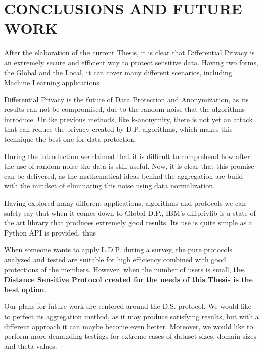\documentclass[inscr]{dithesis}
\begin{document}
\frontmatter

\mainmatter















\chapter{CONCLUSIONS AND FUTURE WORK}

After the elaboration of the current Thesis, it is clear that Differential Privacy is an extremely secure and efficient way to protect sensitive data. Having two forms, the Global and the Local, it can cover many different scenarios, including Machine Learning applications.

Differential Privacy is the future of Data Protection and Anonymization, as its results can not be compromised, due to the random noise that the algorithms introduce. Unlike previous methods, like k-anonymity, there is not yet an attack that can reduce the privacy created by D.P. algorithms, which makes this technique the best one for data protection.

During the introduction we claimed that it is difficult to comprehend how after the use of random noise the data is still useful. Now, it is clear that this promise can be delivered, as the mathematical ideas behind the aggregation are build with the mindset of eliminating this noise using data normalization.

Having explored many different applications, algorithms and protocols we can safely say that when it comes down to Global D.P., IBM's diffprivlib is a state of the art library that produces extremely good results. Its use is quite simple as a Python API is provided, thus 

When someone wants to apply L.D.P. during a survey, the pure protocols analyzed and tested are suitable for high efficiency combined with good protections of the members. However, when the number of users is small, \textbf{the Distance Sensitive Protocol created for the needs of this Thesis is the best option}. 

Our plans for future work are centered around the D.S. protocol. We would like to perfect its aggregation method, as it may produce satisfying results, but with a different approach it can maybe become even better. Moreover, we would like to perform more demanding testings for extreme cases of dataset sizes, domain sizes and theta values.
\end{document}
